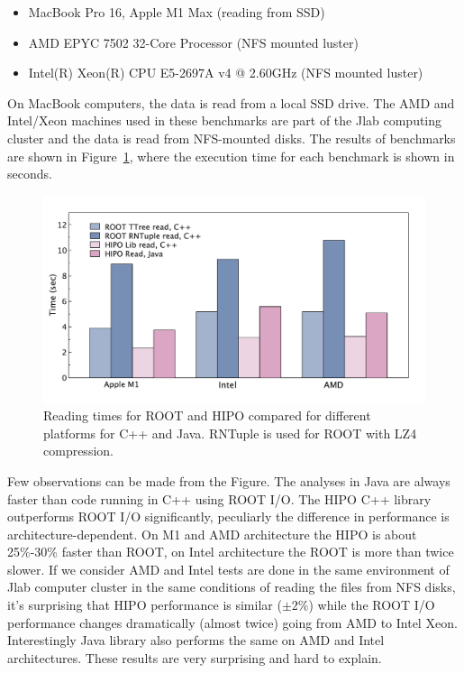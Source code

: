 \documentclass[preprint,12pt]{elsarticle}
\begin{document}
\begin{itemize}
\item MacBook Pro 16, Apple M1 Max (reading from SSD)
\item AMD EPYC 7502 32-Core Processor (NFS mounted luster)
\item Intel(R) Xeon(R) CPU E5-2697A v4 @ 2.60GHz (NFS mounted luster)
\end{itemize}

On MacBook computers, the data is read from a local SSD drive.
The AMD and Intel/Xeon machines used in these benchmarks are part of the Jlab computing cluster 
and the data is read from NFS-mounted disks. The results of benchmarks are shown in Figure~\ref{benchmark:read},
where the execution time for each benchmark is shown in seconds.

 \begin{figure}[!h]
\begin{center}
  \includegraphics[width=5.0in]{bench_root_vs_hipo_read.pdf}
 \caption { Reading times for ROOT and HIPO compared for different platforms for C++ and Java. RNTuple is used for ROOT with LZ4 compression.}
 \label{benchmark:read}
 \end{center}
 \end{figure}

Few observations can be made from the Figure. The analyses in Java are always faster than code running in C++ using ROOT I/O. 
The HIPO C++ library outperforms ROOT I/O significantly, peculiarly the difference in performance is architecture-dependent. 
On M1 and AMD architecture the HIPO is about 25\%-30\% faster than ROOT, on Intel architecture the ROOT is more than twice slower.
If we consider AMD and Intel tests are done in the same environment of Jlab computer cluster in the same conditions of reading the files from NFS 
disks, it's surprising that HIPO performance is similar ($\pm 2\%$) while the ROOT I/O performance changes dramatically (almost twice) going 
from AMD to Intel Xeon. Interestingly Java library also performs the same on AMD and Intel architectures. These results are very surprising and 
hard to explain.
\end{document}

